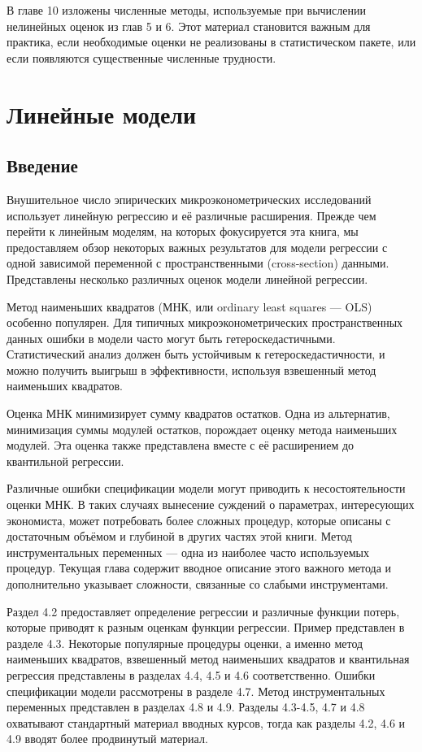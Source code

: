 В главе 10 изложены численные методы, используемые при вычислении нелинейных оценок из глав 5 и 6. Этот материал становится важным для практика, если необходимые оценки не реализованы в статистическом пакете, или если появляются существенные численные трудности.




\chapter{Линейные модели}

\section{Введение}

Внушительное число эпирических микроэконометрических исследований использует линейную регрессию и её различные расширения. Прежде чем перейти к линейным моделям, на которых фокусируется эта книга, мы предоставляем обзор некоторых важных результатов для модели регрессии с одной зависимой переменной с пространственными (cross-section) данными. Представлены несколько различных оценок модели линейной регрессии.

Метод наименьших квадратов (МНК, или ordinary least squares --- OLS) особенно популярен. Для типичных микроэконометрических пространственных данных ошибки в модели часто могут быть гетероскедастичными. Статистический анализ должен быть устойчивым к гетероскедастичности, и можно получить выигрыш в эффективности, используя взвешенный метод наименьших квадратов.

Оценка МНК минимизирует сумму квадратов остатков. Одна из альтернатив, минимизация суммы модулей остатков, порождает оценку метода наименьших модулей. Эта оценка также представлена вместе с её расширением до квантильной регрессии.

Различные ошибки спецификации модели могут приводить к несостоятельности оценки МНК. В таких случаях вынесение суждений о параметрах, интересующих экономиста, может потребовать более сложных процедур, которые описаны с достаточным объёмом и глубиной в других частях этой книги. Метод инструментальных переменных --- одна из наиболее часто используемых процедур. Текущая глава содержит вводное описание этого важного метода и дополнительно указывает сложности, связанные со слабыми инструментами.

Раздел 4.2 предоставляет определение регрессии и различные функции потерь, которые приводят к разным оценкам функции регрессии. Пример представлен в разделе 4.3. Некоторые популярные процедуры оценки, а именно метод наименьших квадратов, взвешенный метод наименьших квадратов и квантильная регрессия представлены в разделах 4.4, 4.5 и 4.6 соответственно. Ошибки спецификации модели рассмотрены в разделе 4.7. Метод	инструментальных переменных представлен в разделах 4.8 и 4.9. Разделы 4.3-4.5, 4.7 и 4.8 охватывают стандартный материал вводных курсов, тогда как разделы 4.2, 4.6 и 4.9 вводят более продвинутый материал.

